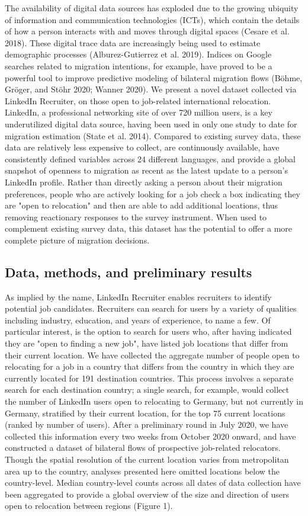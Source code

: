 The availability of digital data sources has exploded due to the growing ubiquity of information and communication technologies (ICTs), which contain the details of how a person interacts with and moves through digital spaces (Cesare et al. 2018). These digital trace data are increasingly being used to estimate demographic processes (Alburez-Gutierrez et al. 2019). Indices on Google searches related to migration intentions, for example, have proved to be a powerful tool to improve predictive modeling of bilateral migration flows (Böhme, Gröger, and Stöhr 2020; Wanner 2020). We present a novel dataset collected via LinkedIn Recruiter, on those open to job-related international relocation. LinkedIn, a professional networking site of over 720 million users, is a key underutilized digital data source, having been used in only one study to date for migration estimation (State et al. 2014). Compared to existing survey data, these data are relatively less expensive to collect, are continuously available, have consistently defined variables across 24 different languages, and provide a global snapshot of openness to migration as recent as the latest update to a person’s LinkedIn profile. Rather than directly asking a person about their migration preferences, people who are actively looking for a job check a box indicating they are "open to relocation" and then are able to add additional locations, thus removing reactionary responses to the survey instrument. When used to complement existing survey data, this dataset has the potential to offer a more complete picture of migration decisions.

\subsection*{Data, methods, and preliminary results}
As implied by the name, LinkedIn Recruiter enables recruiters to identify potential job candidates. Recruiters can search for users by a variety of qualities including industry, education, and years of experience, to name a few. Of particular interest, is the option to search for users who, after having indicated they are "open to finding a new job", have listed job locations that differ from their current location. We have collected the aggregate number of people open to relocating for a job in a country that differs from the country in which they are currently located for 191 destination countries. This process involves a separate search for each destination country; a single search, for example, would collect the number of LinkedIn users open to relocating to Germany, but not currently in Germany, stratified by their current location, for the top 75 current locations (ranked by number of users). After a preliminary round in July 2020, we have collected this information every two weeks from October 2020 onward, and have constructed a dataset of bilateral flows of prospective job-related relocators. Though the spatial resolution of the current location varies from metropolitan area up to the country, analyses presented here omitted locations below the country-level. Median country-level counts across all dates of data collection have been aggregated to provide a global overview of the size and direction of users open to relocation between regions (Figure 1).

